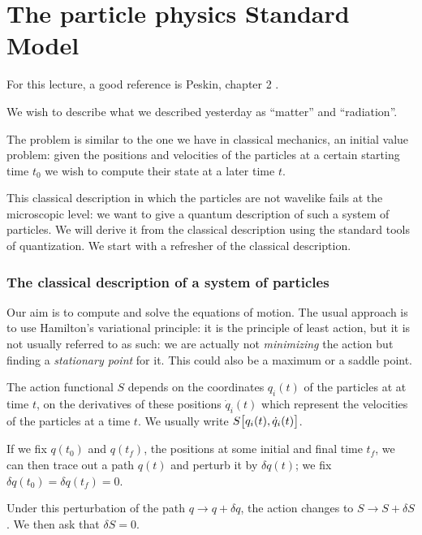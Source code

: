 \documentclass[main.tex]{subfiles}
\begin{document}

\chapter{The particle physics Standard Model}

For this lecture, a good reference is Peskin, chapter 2 \cite{peskinConceptsElementaryParticle2019}.

We wish to describe what we described yesterday as ``matter'' and ``radiation''.

The problem is similar to the one we have in classical mechanics, an initial value problem: given the positions and velocities of the particles at a certain starting time \(t_0 \) we wish to compute their state at a later time \(t\).

This classical description in which the particles are not wavelike fails at the microscopic level: we want to give a quantum description of such a system of particles. 
We will derive it from the classical description using the standard tools of quantization. 
We start with a refresher of the classical description.

\subsection{The classical description of a system of particles}

Our aim is to compute and solve the equations of motion.
The usual approach is to use Hamilton's variational principle: it is the principle of least action, but it is not usually referred to as such: we are actually not \emph{minimizing} the action but finding a \emph{stationary point} for it.
This could also be a maximum or a saddle point.

The action functional \(S\) depends on the coordinates \(q_i(t)\) of the particles at at time \(t\), on the derivatives of these positions \(\dot{q}_{i}(t)\) which represent the velocities of the particles at a time \(t\). 
We usually write \(S \qty[q_{i}(t), \dot{q}_{i}(t)]\). 

If we fix \(q(t_0 )\) and \(q(t_{f})\), the positions at some initial and final time \(t_f\), we can then trace out a path \(q(t)\) and perturb it by \(\delta q(t)\); we fix \(\delta q(t_0 ) = \delta q(t_f) = 0\). 

Under this perturbation of the path \(q \rightarrow q + \delta q\), the action changes to \(S \rightarrow S + \delta S\). 
We then ask that \(\delta S =0\). 
\end{document}

